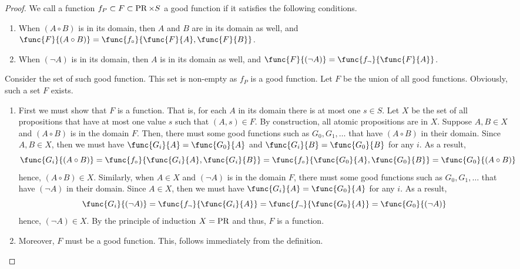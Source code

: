 \begin{proof}
    We call a function \(f_P \subset F \subset \operatorname{PR} \times S\) a good function if it satisfies the following conditions.
    \begin{enumerate}
        \item When \((A \circ B)\) is in its domain, then \(A\) and \(B\) are in its domain as well, and \(\func{F}{(A \circ B)} = \func{f_{\circ}}{\func{F}{A}, \func{F}{B}}\).
        \item When \((\neg A)\) is in its domain, then \(A\) is in its domain as well, and \(\func{F}{(\neg A)} = \func{f_{\neg}}{\func{F}{A}}\).
    \end{enumerate}
    Consider the set of such good function. This set is non-empty as \(f_P\) is a good function. Let \(F\) be the union of all good functions. Obviously, such a set \(F\) exists.
    \begin{enumerate}
        \item First we must show that \(F\) is a function. That is, for each \(A\) in its domain there is at most one \(s \in S\). Let \(X\) be the set of all propositions that have at most one value \(s\) such that \((A,s) \in F\). By construction, all atomic propositions are in \(X\). Suppose \(A,B \in X\) and \((A \circ B)\) is in the domain \(F\). Then, there must some good functions such as \(G_0,G_1,\dots\) that have \((A \circ B)\) in their domain. Since \(A,B \in X\), then we must have \(\func{G_i}{A} = \func{G_0}{A}\) and \(\func{G_i}{B} = \func{G_0}{B}\) for any \(i\). As a result, 
        \begin{equation}
            \func{G_i}{(A \circ B)} = \func{f_{\circ}}{\func{G_i}{A},\func{G_i}{B}} =  \func{f_{\circ}}{\func{G_0}{A},\func{G_0}{B}} =  \func{G_0}{(A \circ B)} 
        \end{equation}
        hence, \((A \circ B) \in X\). Similarly, when \(A \in X\) and \((\neg A)\) is in the domain \(F\), there must some good functions such as \(G_0,G_1,\dots\) that have \((\neg A)\) in their domain. Since \(A \in X\), then we must have \(\func{G_i}{A} = \func{G_0}{A}\) for any \(i\). As a result,
        \begin{equation}
            \func{G_i}{(\neg A)} = \func{f_{\neg}}{\func{G_i}{A}} =  \func{f_{\neg}}{\func{G_0}{A}} =  \func{G_0}{(\neg A)} 
        \end{equation}
        hence, \((\neg A) \in X\). By the principle of induction \(X = \operatorname{PR}\) and thus, \(F\) is a function.
        \item  Moreover, \(F\) must be a good function. This, follows immediately from the definition.

\end{enumerate}
\end{proof}

